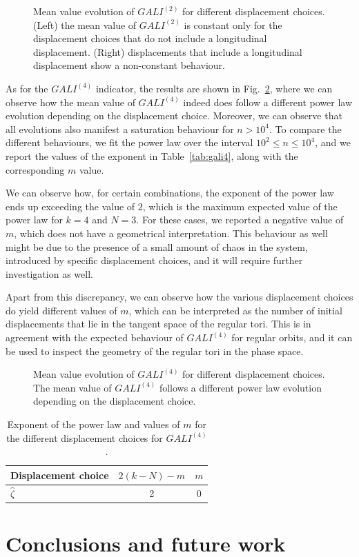 \begin{figure}
    \centering
    \caption{Mean value evolution of $GALI^{(2)}$ for different displacement choices. (Left) the mean value of $GALI^{(2)}$ is constant only for the displacement choices that do not include a longitudinal displacement. (Right) displacements that include a longitudinal displacement show a non-constant behaviour.}
    \label{fig:gali2}
\end{figure}

As for the $GALI^{(4)}$ indicator, the results are shown in Fig.~\ref{fig:gali4}, where we can observe how the mean value of $GALI^{(4)}$ indeed does follow a different power law evolution depending on the displacement choice. Moreover, we can observe that all evolutions also manifest a saturation behaviour for $n>10^4$. To compare the different behaviours, we fit the power law over the interval $10^2\leq n \leq 10^4$, and we report the values of the exponent in Table~\ref{tab:gali4}, along with the corresponding $m$ value.

We can observe how, for certain combinations, the exponent of the power law ends up exceeding the value of $2$, which is the maximum expected value of the power law for $k=4$ and $N=3$. For these cases, we reported a negative value of $m$, which does not have a geometrical interpretation. This behaviour as well might be due to the presence of a small amount of chaos in the system, introduced by specific displacement choices, and it will require further investigation as well.

Apart from this discrepancy, we can observe how the various displacement choices do yield different values of $m$, which can be interpreted as the number of initial displacements that lie in the tangent space of the regular tori. This is in agreement with the expected behaviour of $GALI^{(4)}$ for regular orbits, and it can be used to inspect the geometry of the regular tori in the phase space.

\begin{figure}
    \centering
    \caption{Mean value evolution of $GALI^{(4)}$ for different displacement choices. The mean value of $GALI^{(4)}$ follows a different power law evolution depending on the displacement choice.}
    \label{fig:gali4}
\end{figure}

\begin{table}
    \centering
    \begin{tabular}{l|cc}
        \toprule
        Displacement choice & $2(k-N)-m$ & $m$ \\
        \midrule
        $\hat{\zeta}$ & 2 & 0 \\
        \bottomrule        
    \end{tabular}
    \caption{Exponent of the power law and values of $m$ for the different displacement choices for $GALI^{(4)}$.}
\end{table}


\section{Conclusions and future work}